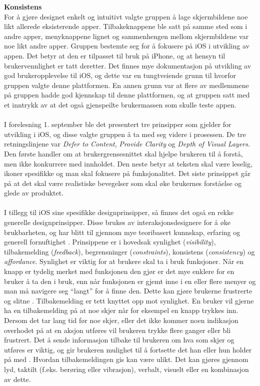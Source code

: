 \noindent\textbf{Konsistens}\\
For å gjøre designet enkelt og intuitivt valgte gruppen å lage skjermbildene noe likt allerede eksisterende apper. Tilbakeknappene ble satt på samme sted som i andre apper, menyknappene lignet og sammenhengen mellom skjermbildene var noe likt andre apper. Gruppen bestemte seg for å fokusere på iOS i utvikling av appen. Det betyr at den er tilpasset til bruk på iPhone, og at hensyn til brukervennlighet er tatt deretter. Det finnes mye dokumentasjon på utvikling av god brukeropplevelse til iOS, og dette var en tungtveiende grunn til hvorfor gruppen valgte denne plattformen. En annen grunn var at flere av medlemmene på gruppen hadde god kjennskap til denne plattformen, og at gruppen satt med et inntrykk av at det også gjenspeilte brukermassen som skulle teste appen.
\\\\
I forelesning 1. september ble det presentert tre prinsipper som gjelder for utvikling i iOS, og disse valgte gruppen å ta med seg videre i prosessen. De tre retningslinjene var \textit{Defer to Content}, \textit{Provide Clarity} og \textit{Depth of Visual Layers}\cite{guidelines}. Den første handler om at brukergrensesnittet skal hjelpe brukeren til å forstå, men ikke konkurrere med innholdet. Den neste betyr at teksten skal være leselig, ikoner spesifikke og man skal fokusere på funksjonalitet. Det siste prinsippet går på at det skal være realistiske bevegelser som skal øke brukernes forståelse og glede av produktet. 
\\\\
I tillegg til iOS sine spesifikke designprinsipper, så finnes det også en rekke generelle designprinsipper. Disse brukes av interaksjonsdesignere for å øke brukbarheten, og har blitt til gjennom mye teoribasert kunnskap, erfaring og generell fornuftighet \cite[p.~26]{preece}. Prinsippene er i hovedsak synlighet (\textit{visibility}), tilbakemelding (\textit{feedback}), begrensninger (\textit{constraints}), konsistens (\textit{consistency}) og \textit{affordance}. Synlighet er viktig for at brukere skal ta i bruk funksjoner. Når en knapp er tydelig merket med funksjonen den gjør er det mye enklere for en bruker å ta den i bruk, enn når funksjonen er gjemt inne i en eller flere menyer og man må navigere seg “langt” for å finne den. Dette kan gjøre brukerne frustrerte og slitne \cite[p.~26]{preece}.
Tilbakemelding er tett knyttet opp mot synlighet. En bruker vil gjerne ha en tilbakemelding på at noe skjer når for eksempel en knapp trykkes inn. Dersom det tar lang tid før noe skjer, eller det ikke kommer noen indikasjon overhodet på at en aksjon utføres vil brukeren trykke flere ganger eller bli frustrert. Det å sende informasjon tilbake til brukeren om hva som skjer og utføres er viktig, og gir brukeren mulighet til å fortsette det han eller hun holder på med \cite[p.~26]{preece}. Hvordan tilbakemeldingen gis kan være ulikt. Det kan gjøres gjennom lyd, taktilt (f.eks. berøring eller vibrasjon), verbalt, visuelt eller en kombinasjon av dette.
